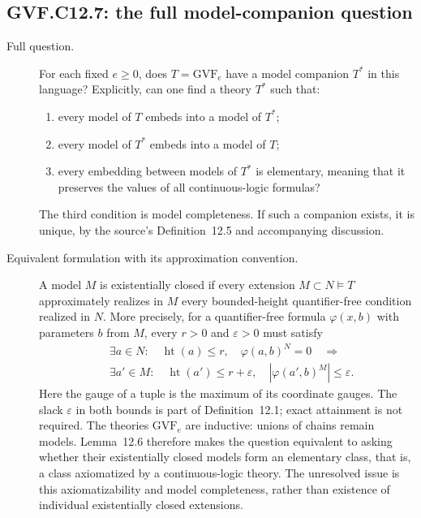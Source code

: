 \documentclass[11pt,a4paper]{article}
\theoremstyle{definition}
\theoremstyle{remark}
\begin{document}
\subsection*{GVF.C12.7: the full model-companion question}
\begin{description}
\item[Full question.]
For each fixed $e\geq0$, does $T=\mathrm{GVF}_e$ have a model companion
$T^*$ in this language? Explicitly, can one find a theory $T^*$ such that:
\begin{enumerate}
\item every model of $T$ embeds into a model of $T^*$;
\item every model of $T^*$ embeds into a model of $T$;
\item every embedding between models of $T^*$ is elementary, meaning
that it preserves the values of all continuous-logic formulas?
\end{enumerate}
The third condition is model completeness. If such a companion exists,
it is unique, by the source's Definition~12.5 and accompanying discussion.

\item[Equivalent formulation with its approximation convention.]
A model $M$ is existentially closed if every extension
$M\subset N\models T$ approximately realizes in $M$ every bounded-height
quantifier-free condition realized in $N$. More precisely, for a
quantifier-free formula $\varphi(x,b)$ with parameters $b$ from $M$,
every $r>0$ and $\varepsilon>0$ must satisfy
\[
 \begin{split}
 &\exists a\in N:\quad
       \operatorname{ht}(a)\leq r,\quad\varphi(a,b)^N=0\quad\Longrightarrow\\
 &\exists a'\in M:\quad
       \operatorname{ht}(a')\leq r+\varepsilon,\quad
       |\varphi(a',b)^M|\leq\varepsilon.
 \end{split}
\]
Here the gauge of a tuple is the maximum of its coordinate gauges.
The slack $\varepsilon$ in both bounds is part of Definition~12.1;
exact attainment is not required. The theories $\mathrm{GVF}_e$ are
inductive: unions of chains remain models. Lemma~12.6 therefore makes
the question equivalent to asking whether their existentially closed
models form an elementary class, that is, a class axiomatized by a
continuous-logic theory. The unresolved issue is this axiomatizability
and model completeness, rather than existence of individual
existentially closed extensions.


\end{description}
\end{document}
